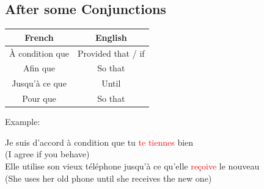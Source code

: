 \documentclass{book}
\begin{document}
    \subsection{After some Conjunctions}
        \begin{center}
            \begin{tabular}{|c|c|}
                \hline
                \textbf{French} & \textbf{English} \\
                \hline
                À condition que & Provided that / if \\
                \hline
                Afin que & So that \\
                \hline
                Jusqu'à ce que & Until \\
                \hline
                Pour que & So that \\
                \hline
            \end{tabular}
        \end{center}
        Example:
        \begin{center}
            Je suis d'accord à condition que tu \textcolor{red}{te tiennes} bien \\
            (I agree if you behave) \\
            Elle utilise son vieux téléphone jusqu'à ce qu'elle \textcolor{red}{reçoive} le nouveau \\
            (She uses her old phone until she receives the new one)
        \end{center}
\end{document}
